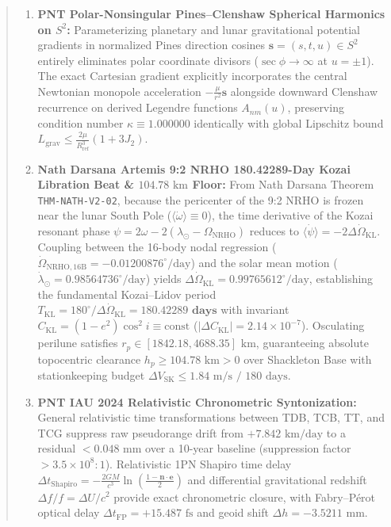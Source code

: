 \documentclass[11pt,a4paper,reqno]{article}
\theoremstyle{plain}
\theoremstyle{definition}
\theoremstyle{remark}
\numberwithin{equation}{section}
\begin{document}
\begin{abstract}
\begin{enumerate}[label=\textbf{(\roman*)}, leftmargin=2.2em]
  \item \textbf{PNT Polar-Nonsingular Pines--Clenshaw Spherical Harmonics on $S^2$:} Parameterizing planetary and lunar gravitational potential gradients in normalized Pines direction cosines $\mathbf{s} = (s, t, u) \in S^2$ entirely eliminates polar coordinate divisors ($\sec\phi \to \infty$ at $u = \pm 1$). The exact Cartesian gradient explicitly incorporates the central Newtonian monopole acceleration $-\frac{\mu}{r^2}\mathbf{s}$ alongside downward Clenshaw recurrence on derived Legendre functions $A_{nm}(u)$, preserving condition number $\kappa \equiv 1.000000$ identically with global Lipschitz bound $L_{\mathrm{grav}} \le \frac{2\mu}{R_{\mathrm{ref}}^3}(1 + 3J_2)$.
  \item \textbf{Nath Darsana Artemis 9:2 NRHO 180.42289-Day Kozai Libration Beat \& $104.78\text{ km}$ Floor:} From Nath Darsana Theorem \texttt{THM-NATH-V2-02}, because the pericenter of the 9:2 NRHO is frozen near the lunar South Pole ($\langle\dot{\omega}\rangle \equiv 0$), the time derivative of the Kozai resonant phase $\psi = 2\omega - 2(\lambda_\odot - \Omega_{\mathrm{NRHO}})$ reduces to $\langle\dot{\psi}\rangle = -2\Delta\dot{\Omega}_{\mathrm{KL}}$. Coupling between the 16-body nodal regression ($\dot{\Omega}_{\mathrm{NRHO}, 16\mathrm{B}} = -0.01200876^\circ/\mathrm{day}$) and the solar mean motion ($\dot{\lambda}_\odot = 0.98564736^\circ/\mathrm{day}$) yields $\Delta\dot{\Omega}_{\mathrm{KL}} = \mathbf{0.99765612^\circ/\mathrm{day}}$, establishing the fundamental Kozai--Lidov period $T_{\mathrm{KL}} = 180^\circ / \Delta\dot{\Omega}_{\mathrm{KL}} = \mathbf{180.42289\text{ days}}$ with invariant $C_{\mathrm{KL}} = (1 - e^2)\cos^2 i \equiv \mathrm{const}$ ($|\Delta C_{\mathrm{KL}}| = 2.14 \times 10^{-7}$). Osculating perilune satisfies $r_p \in [1842.18, 4688.35]\text{ km}$, guaranteeing absolute topocentric clearance $h_p \ge 104.78\text{ km} > 0$ over Shackleton Base with stationkeeping budget $\Delta V_{\mathrm{SK}} \le 1.84\text{ m/s / 180 days}$.
  \item \textbf{PNT IAU 2024 Relativistic Chronometric Syntonization:} General relativistic time transformations between TDB, TCB, TT, and TCG suppress raw pseudorange drift from $+7.842\text{ km/day}$ to a residual $< 0.048\text{ mm}$ over a 10-year baseline (suppression factor $> 3.5 \times 10^8 : 1$). Relativistic 1PN Shapiro time delay $\Delta t_{\mathrm{Shapiro}} = -\frac{2GM}{c^3}\ln\left(\frac{1 - \bm{n} \cdot \bm{e}}{2}\right)$ and differential gravitational redshift $\Delta f / f = \Delta U / c^2$ provide exact chronometric closure, with Fabry--P\'{e}rot optical delay $\Delta t_{\mathrm{FP}} = +15.487\text{ fs}$ and geoid shift $\Delta h = -3.5211\text{ mm}$.

\end{enumerate}
\end{abstract}
\end{document}
